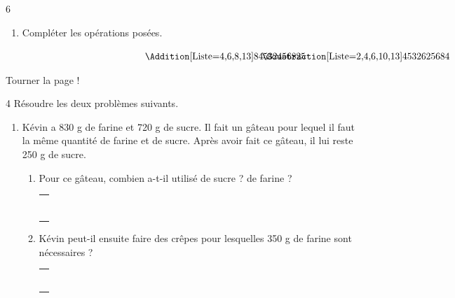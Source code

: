 \documentclass[a4paper]{book}
\begin{document}
{\begin{exerciceNote}{6}
\begin{enumerate}[leftmargin=*]
            \medskip

            \item Compléter les opérations posées.

            \medskip

            $\begin{array}{p{4cm}p{4cm}p{4cm}p{4cm}}
                &\Addition[Liste={4,6,8,13}]{84532}{456825}
                & \Soustraction[Liste={2,4,6,10,13}]{45326}{25684}
            \end{array}$
        \end{enumerate}       
    \end{exerciceNote}


    \vfill \hfill Tourner la page ! 
    

\newpage


    \begin{exerciceNote}{4}
        Résoudre les deux problèmes suivants.

        \begin{enumerate}[leftmargin=*]
            \item Kévin a 830 g de farine et 720 g de sucre. Il fait un gâteau pour lequel il faut la même quantité de farine et de sucre. Après avoir fait ce gâteau, il lui reste 250 g de sucre.
            \begin{enumerate}
                \item Pour ce gâteau, combien a-t-il utilisé de sucre ? de farine ?

                \begin{tabular}{|p{16cm}|}
                    \hline \\ \\ \\ \\ \\ \\ \\ \hline            
                \end{tabular}

                \item Kévin peut-il ensuite faire des crêpes pour lesquelles 350 g de farine sont nécessaires ?

                \begin{tabular}{|p{16cm}|}
                    \hline \\ \\ \\ \\ \\ \\ \hline            
                \end{tabular}
            \end{enumerate}


\end{enumerate}
\end{exerciceNote}}
\end{document}
